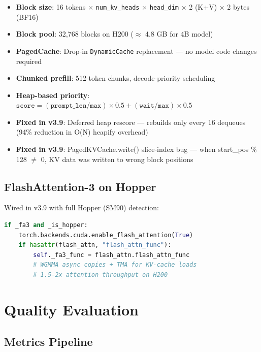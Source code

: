 \documentclass[11pt,a4paper,twoside]{article}
\begin{document}
\begin{itemize}[nosep]
  \item \textbf{Block size}: 16 tokens $\times$ \texttt{num\_kv\_heads} $\times$
    \texttt{head\_dim} $\times$ 2 (K+V) $\times$ 2 bytes (BF16)
  \item \textbf{Block pool}: 32,768 blocks on H200 ($\approx$ 4.8 GB for 4B model)
  \item \textbf{PagedCache}: Drop-in \texttt{DynamicCache} replacement --- no model
    code changes required
  \item \textbf{Chunked prefill}: 512-token chunks, decode-priority scheduling
  \item \textbf{Heap-based priority}: $\texttt{score} = (\texttt{prompt\_len}/\texttt{max}) \times 0.5 + (\texttt{wait}/\texttt{max}) \times 0.5$
  \item \textbf{Fixed in v3.9}: Deferred heap rescore --- rebuilds only every 16
    dequeues (94\% reduction in O(N) heapify overhead)
  \item \textbf{Fixed in v3.9}: PagedKVCache.write() slice-index bug --- when
    start\_pos \% 128 $\neq$ 0, KV data was written to wrong block positions
\end{itemize}

\subsection{FlashAttention-3 on Hopper}

Wired in v3.9 with full Hopper (SM90) detection:

\begin{lstlisting}[language=Python, caption=FA3 Detection and Wiring]
if _fa3 and _is_hopper:
    torch.backends.cuda.enable_flash_attention(True)
    if hasattr(flash_attn, "flash_attn_func"):
        self._fa3_func = flash_attn.flash_attn_func
        # WGMMA async copies + TMA for KV-cache loads
        # 1.5-2x attention throughput on H200
\end{lstlisting}

\section{Quality Evaluation}

\subsection{Metrics Pipeline}
\end{document}
